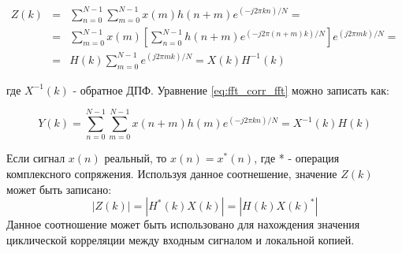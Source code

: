 \begin{center}
\begin{eqnarray}
	\label{eq:fft_corr_fft}
	Z(k) & = & \sum\limits_{n=0}^{N-1}\sum\limits_{m=0}^{N-1}{x(m)h(n+m)e^{(-j2\pi{kn})/N}}=\nonumber \\
	& = & \sum\limits_{m=0}^{N-1}{x(m)}[\sum\limits_{n=0}^{N-1}h(n+m)e^{(-j2\pi{(n+m)}k)/N}]e^{(j2\pi{m}k)/N}=\\
	& = & H(k)\sum\limits_{m=0}^{N-1}e^{(j2\pi{m}k)/N} = X(k)H^{-1}(k)\nonumber 
\end{eqnarray}
\end{center}
где ${X^{-1}(k)}$ - обратное ДПФ. Уравнение \ref{eq:fft_corr_fft} можно записать как:

\begin{equation}
	\label{eq:fft_corr_fft_rev}
	Y(k) = \sum\limits_{n=0}^{N-1}\sum\limits_{m=0}^{N-1}{x(n+m)h(m)e^{(-j2\pi{kn})/N}}=X^{-1}(k)H(k)
\end{equation}

Если сигнал $x(n)$ реальный, то $x(n) = x^*(n)$, где * - операция комплексного сопряжения. Используя данное соотнешение,
значение $Z(k)$ может быть записано:
\begin{equation}
	\label{eq:fft_magnitude}
	|Z(k)|=|H^*(k)X(k)|=|H(k)X(k)^*|
\end{equation}
Данное соотношение может быть использовано для нахождения значения циклической корреляции между входным сигналом и 
локальной копией.

\newpage
